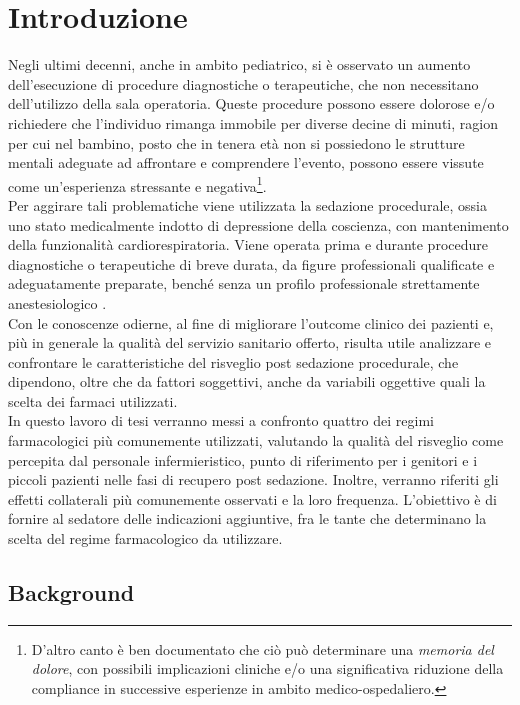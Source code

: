 \chapter{Introduzione}


Negli ultimi decenni, anche in ambito pediatrico, si è osservato un aumento dell'esecuzione di procedure diagnostiche o terapeutiche, che non necessitano dell'utilizzo della sala operatoria. Queste procedure possono essere dolorose e/o richiedere che l'individuo rimanga immobile per diverse decine di minuti, ragion per cui nel bambino, posto che in tenera età non si possiedono le strutture mentali adeguate ad affrontare e comprendere l'evento, possono essere vissute come un'esperienza stressante e negativa\footnote{D'altro canto è ben documentato \cite{Memoriadolorechir, Memoriadol2004, Memoryforpain1999} che ciò può determinare una \emph{memoria del dolore}, con possibili implicazioni cliniche e/o una significativa riduzione della compliance in successive esperienze in ambito medico-ospedaliero.}.
\\Per aggirare tali problematiche viene utilizzata la sedazione procedurale, ossia uno stato medicalmente indotto di depressione della coscienza, con mantenimento della funzionalità cardiorespiratoria. Viene operata prima e durante procedure diagnostiche o terapeutiche di breve durata, da figure professionali qualificate e adeguatamente preparate, benché senza un profilo professionale strettamente anestesiologico \cite{Krauss2006, Simeupsedazione}. 
\\Con le conoscenze odierne, al fine di migliorare l'outcome clinico dei pazienti e, più in generale la qualità del servizio sanitario offerto, risulta utile analizzare e confrontare le caratteristiche del risveglio post sedazione procedurale, che dipendono, oltre che da fattori soggettivi, anche da variabili oggettive quali la scelta dei farmaci utilizzati. 
\\In questo lavoro di tesi verranno messi a confronto quattro dei regimi farmacologici più comunemente utilizzati, valutando la qualità del risveglio come percepita dal personale infermieristico, punto di riferimento per i genitori e i piccoli pazienti nelle fasi di recupero post sedazione. Inoltre, verranno riferiti gli effetti collaterali più comunemente osservati e la loro frequenza. L'obiettivo è di fornire al sedatore delle indicazioni aggiuntive, fra le tante che determinano la scelta del regime farmacologico da utilizzare.

\section{Background}

